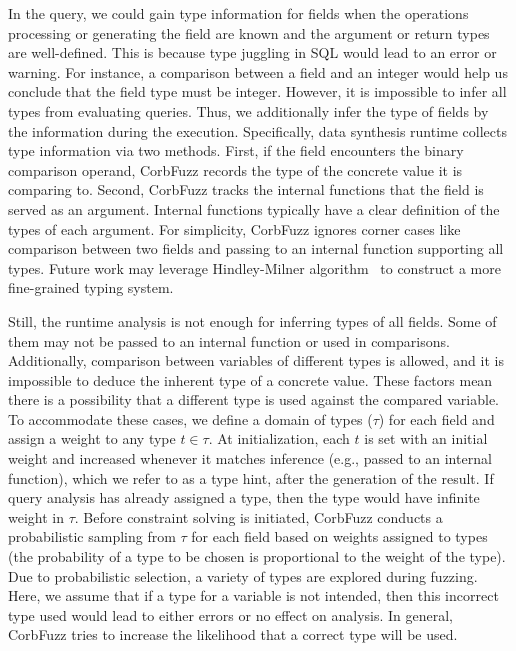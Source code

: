 \documentclass[10pt,conference]{IEEEtran}
\begin{document}
In the query, we could gain type information for fields when the operations processing or generating the field are known and the argument or return types are well-defined. This is because type juggling in SQL would lead to an error or warning. For instance, a comparison between a field and an integer would help us conclude that the field type must be integer. However, it is impossible to infer all types from evaluating queries. Thus, we additionally infer the type of fields by the information during the execution. Specifically, data synthesis runtime collects type information via two methods. First, if the field encounters the binary comparison operand, CorbFuzz records the type of the concrete value it is comparing to. Second, CorbFuzz tracks the internal functions that the field is served as an argument. Internal functions typically have a clear definition of the types of each argument. For simplicity, CorbFuzz ignores corner cases like comparison between two fields and passing to an internal function supporting all types. Future work may leverage Hindley-Milner algorithm~\cite{milner_theory_1978} to construct a more fine-grained typing system.

Still, the runtime analysis is not enough for inferring types of all fields. Some of them may not be passed to an internal function or used in comparisons. Additionally, comparison between variables of different types is allowed, and it is impossible to deduce the inherent type of a concrete value. These factors mean there is a possibility that a different type is used against the compared variable. To accommodate these cases, we define a domain of types ($\tau$) for each field and assign a weight to any type $t \in \tau$. At initialization, each $t$ is set with an initial weight and increased whenever it matches inference (e.g., passed to an internal function), which we refer to as a type hint, after the generation of the result. If query analysis has already assigned a type, then the type would have infinite weight in $\tau$. Before constraint solving is initiated, CorbFuzz conducts a probabilistic sampling from $\tau$ for each field based on weights assigned to types (the probability of a type to be chosen is proportional to the weight of the type). Due to probabilistic selection, a variety of types are explored during fuzzing. Here, we assume that if a type for a variable is not intended, then this incorrect type used would lead to either errors or no effect on analysis. 
In general, CorbFuzz tries to increase the likelihood that a correct type will be used.
\end{document}
